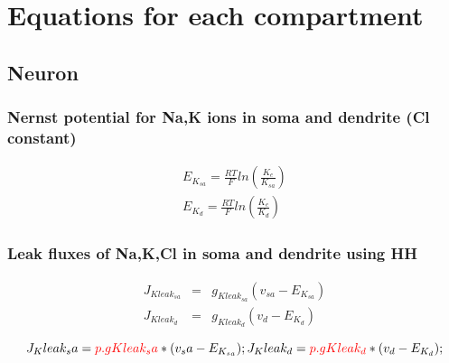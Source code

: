\documentclass[fleqn]{report}
\numberwithin{equation}{section}
\numberwithin{equation}{section}
\newcommand{\RTF}{$\frac{RT}{F}$}
\begin{document}
				            
	\chapter{Equations for each  compartment }
	\section{Neuron}
	\subsection{Nernst potential for Na,K ions in soma and dendrite (Cl constant)} 
				            				\begin{eqnarray}
				            					 E_{K_{sa}}      =\frac{RT}{F}  ln(\frac{K_e}{K_{sa}})\\
				            					 E_{K_{d}}      =\frac{RT}{F}  ln(\frac{K_e}{K_{d}})
				            				\end{eqnarray}
	\subsection{Leak fluxes of Na,K,Cl in soma and dendrite using HH}
				 \begin{eqnarray}
								                        J_{Kleak_{sa}}  &=& g_{Kleak_{sa}} (v_{sa} - E_{K_{sa}})\\
								                        J_{Kleak_{d}}   &=& g_{Kleak_d} (v_d - E_{K_{d}})\\
				 \end{eqnarray}
\begin{equation*}
J_Kleak_sa  = \textcolor{red}{p.gKleak_sa} * (v_sa - E_{K_{sa}});\\
J_Kleak_d   = \textcolor{red}{p.gKleak_d} * (v_d - E_{K_{d}});
				 \end{equation*} 
\end{document}
